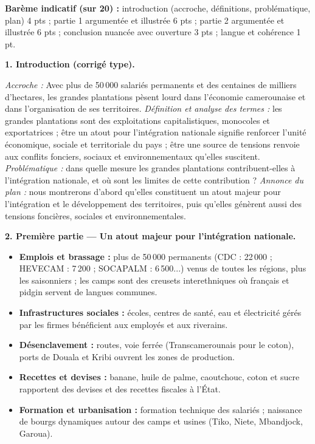 \documentclass[11pt]{article}
\begin{document}
\begin{corrige}
\textbf{Barème indicatif (sur 20) :} introduction (accroche, définitions, problématique, plan) 4 pts ; partie 1 argumentée et illustrée 6 pts ; partie 2 argumentée et illustrée 6 pts ; conclusion nuancée avec ouverture 3 pts ; langue et cohérence 1 pt.

\textbf{1. Introduction (corrigé type).}

\emph{Accroche :} Avec plus de 50\,000 salariés permanents et des centaines de milliers d'hectares, les grandes plantations pèsent lourd dans l'économie camerounaise et dans l'organisation de ses territoires. \emph{Définition et analyse des termes :} les grandes plantations sont des exploitations capitalistiques, monocoles et exportatrices ; être un \og atout pour l'intégration nationale \fg{} signifie renforcer l'unité économique, sociale et territoriale du pays ; être une \og source de tensions \fg{} renvoie aux conflits fonciers, sociaux et environnementaux qu'elles suscitent. \emph{Problématique :} dans quelle mesure les grandes plantations contribuent-elles à l'intégration nationale, et où sont les limites de cette contribution ? \emph{Annonce du plan :} nous montrerons d'abord qu'elles constituent un atout majeur pour l'intégration et le développement des territoires, puis qu'elles génèrent aussi des tensions foncières, sociales et environnementales.

\textbf{2. Première partie — Un atout majeur pour l'intégration nationale.}
\begin{itemize}
\item \textbf{Emplois et brassage :} plus de 50\,000 permanents (CDC : 22\,000 ; HEVECAM : 7\,200 ; SOCAPALM : 6\,500...) venus de toutes les régions, plus les saisonniers ; les camps sont des creusets interethniques où français et pidgin servent de langues communes.
\item \textbf{Infrastructures sociales :} écoles, centres de santé, eau et électricité gérés par les firmes bénéficient aux employés et aux riverains.
\item \textbf{Désenclavement :} routes, voie ferrée (Transcamerounais pour le coton), ports de Douala et Kribi ouvrent les zones de production.
\item \textbf{Recettes et devises :} banane, huile de palme, caoutchouc, coton et sucre rapportent des devises et des recettes fiscales à l'État.
\item \textbf{Formation et urbanisation :} formation technique des salariés ; naissance de bourgs dynamiques autour des camps et usines (Tiko, Niete, Mbandjock, Garoua).
\end{itemize}


\end{corrige}
\end{document}
